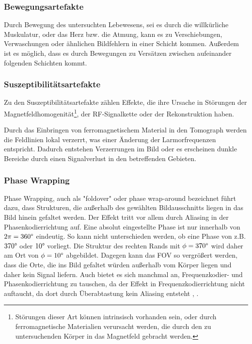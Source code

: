 \subsubsection{Bewegungsartefakte}
Durch Bewegung des untersuchten Lebewesens, sei es durch die willkürliche Muskulatur, oder das Herz bzw. die Atmung, kann es zu Verschiebungen, Verwaschungen oder ähnlichen Bildfehlern in einer Schicht kommen. Außerdem ist es möglich, dass es durch Bewegungen zu Versätzen zwischen aufeinander folgenden Schichten kommt.                       

\subsubsection{Suszeptibilitätsartefakte}
Zu den Suszeptibilitätsartefakte zählen Effekte, die ihre Ursache in Störungen der Magnetfeldhomogenität\footnote{Störungen dieser Art können intrinsisch vorhanden sein, oder durch ferromagnetische Materialien verursacht werden, die durch den zu untersuchenden Körper in das Magnetfeld gebracht werden.}, der RF-Signalkette oder der Rekonstruktion haben.

Durch das Einbringen von ferromagnetischem Material in den Tomograph werden die Feldlinien lokal verzerrt, was einer Änderung der Larmorfrequenzen entspricht. Dadurch entstehen Verzerrungen im Bild oder es erscheinen dunkle Bereiche durch einen Signalverlust in den betreffenden Gebieten.

\subsubsection{Phase Wrapping}
Phase Wrapping, auch als "foldover" oder phase wrap-around bezeichnet führt dazu, dass Strukturen, die außerhalb des gewählten Bildausschnitts liegen in das Bild hinein gefaltet werden. Der Effekt tritt vor allem durch Aliasing in der Phasenkodierrichtung auf. Eine absolut eingestellte Phase ist nur innerhalb von $2\pi=360\degree$ eindeutig. So kann nicht unterschieden werden, ob eine Phase von z.B. $370\degree$ oder $10\degree$ vorliegt. Die Struktur des rechten Rands mit $\phi=370\degree$ wird daher am Ort von $\phi=10\degree$ abgebildet. Dagegen kann das FOV so vergrößert werden, dass die Orte, die ins Bild gefaltet würden außerhalb vom Körper liegen und daher kein Signal liefern. Auch bietet es sich manchmal an, Frequenzkodier- und Phasenkodierrichtung zu tauschen, da der Effekt in Frequenzkodierrichtung nicht auftaucht, da dort durch Überabtastung kein Aliasing entsteht \cite{Pusey1988}, \cite{Heiland2008}.

